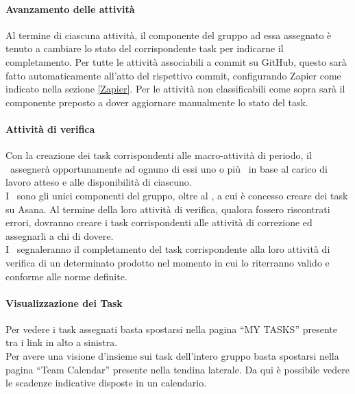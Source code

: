 \documentclass[../NormeDiProgetto.tex]{subfiles}
\begin{document}
				\paragraph{Avanzamento delle attività\\}
					Al termine di ciascuna attività, il componente del gruppo ad essa assegnato è tenuto a
					cambiare lo stato del corrispondente task per indicarne il completamento.
					Per tutte le attività associabili a commit su GitHub, questo sarà fatto automaticamente
					all'atto del rispettivo commit, configurando Zapier come indicato nella sezione \ref{Zapier}.
					Per le attività non classificabili come sopra sarà il componente preposto a dover
					aggiornare manualmente lo stato del task.
				\paragraph{Attività di verifica\\}
					Con la creazione dei task corrispondenti alle macro-attività di periodo, il
					\responsabilediprogetto\ assegnerà opportunamente ad ognuno di essi uno o più \verificatori\
					in base al carico di lavoro atteso e alle disponibilità di ciascuno.\\
					I \verificatori\ sono gli unici componenti del gruppo, oltre al \responsabilediprogetto, a
					cui è concesso creare dei task su Asana. Al termine della loro attività di verifica, qualora
					fossero riscontrati errori, dovranno creare i task corrispondenti alle attività di correzione
					ed assegnarli a chi di dovere.\\
					I \verificatori\ segnaleranno il completamento del task corrispondente alla loro attività di
					verifica di un determinato prodotto nel momento in cui lo riterranno valido e conforme
					alle norme definite.
				\paragraph{Visualizzazione dei Task\\}
					Per vedere i task assegnati basta spostarsi nella pagina ``MY
					TASKS'' presente tra i link in alto a sinistra.\\
					Per avere una visione d'insieme sui task dell'intero gruppo basta
					spostarsi nella pagina ``Team Calendar'' presente nella tendina
					laterale. Da qui è possibile vedere le scadenze indicative disposte
					in un calendario.
\end{document}
